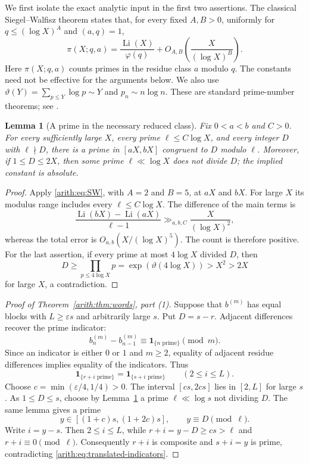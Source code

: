 \documentclass[11pt,a4paper]{article}
\newtheorem{lemma}[theorem]{Lemma}
\theoremstyle{definition}\newtheorem{definition}[theorem]{Definition}
\theoremstyle{remark}\newtheorem{remark}[theorem]{Remark}
\begin{document}
We first isolate the exact analytic input in the first two assertions.
The classical Siegel--Walfisz theorem states that, for every fixed
$A,B>0$, uniformly for $q\le(\log X)^A$ and $(a,q)=1$,
\begin{equation}\label{arith:eq:SW}
 \pi(X;q,a)=\frac{\operatorname{Li}(X)}{\varphi(q)}
       +O_{A,B}\!\left(\frac{X}{(\log X)^B}\right).
\end{equation}
Here $\pi(X;q,a)$ counts primes in the residue class $a$ modulo $q$.
The constants need not be effective for the arguments below.
We also use $\vartheta(Y)=\sum_{p\le Y}\log p\sim Y$ and
$p_n\sim n\log n$.  These are standard prime-number theorems; see
\cite{ArithDavenport}.

\begin{lemma}[A prime in the necessary reduced class]\label{arith:lem:prime}
Fix $0<a<b$ and $C>0$.  For every sufficiently large $X$, every prime
$\ell\le C\log X$, and every integer $D$ with $\ell\nmid D$, there is a
prime in $[aX,bX]$ congruent to $D$ modulo $\ell$.
Moreover, if $1\le D\le2X$, then some prime $\ell\ll\log X$ does not
divide $D$; the implied constant is absolute.
\end{lemma}
\begin{proof}
Apply \eqref{arith:eq:SW}, with $A=2$ and $B=5$, at $aX$ and $bX$.
For large $X$ its modulus range includes every $\ell\le C\log X$.
The difference of the main terms is
\[
 \frac{\operatorname{Li}(bX)-\operatorname{Li}(aX)}{\ell-1}
       \gg_{a,b,C}\frac{X}{(\log X)^2},
\]
whereas the total error is $O_{a,b}(X/(\log X)^5)$.  The count is
therefore positive.  For the last assertion, if every prime at most
$4\log X$ divided $D$, then
\[
 D\ge\prod_{p\le4\log X}p
      =\exp(\vartheta(4\log X))>X^2>2X
\]
for large $X$, a contradiction.
\end{proof}

\begin{proof}[Proof of Theorem~\ref{arith:thm:words}, part (1)]
Suppose that $b^{(m)}$ has equal blocks with $L\ge\varepsilon s$ and
arbitrarily large $s$.  Put $D=s-r$.  Adjacent differences recover the
prime indicator:
\[
 b_n^{(m)}-b_{n-1}^{(m)}\equiv\mathbf1_{\{n\text{ prime}\}}\pmod m.
\]
Since an indicator is either $0$ or $1$ and $m\ge2$, equality of adjacent
residue differences implies equality of the indicators.  Thus
\begin{equation}\label{arith:eq:translated-indicators}
 \mathbf1_{\{r+i\text{ prime}\}}
   =\mathbf1_{\{s+i\text{ prime}\}}\qquad(2\le i\le L).
\end{equation}
Choose $c=\min(\varepsilon/4,1/4)>0$.  The interval
$[cs,2cs]$ lies in $[2,L]$ for large $s$.  As $1\le D\le s$, choose by
Lemma~\ref{arith:lem:prime} a prime $\ell\ll\log s$ not dividing $D$.
The same lemma gives a prime
\[
 y\in[(1+c)s,(1+2c)s],\qquad y\equiv D\pmod\ell.
\]
Write $i=y-s$.  Then $2\le i\le L$, while
$r+i=y-D\ge cs>\ell$ and $r+i\equiv0\pmod\ell$.
Consequently $r+i$ is composite and $s+i=y$ is prime, contradicting
\eqref{arith:eq:translated-indicators}.
\end{proof}
\end{document}
